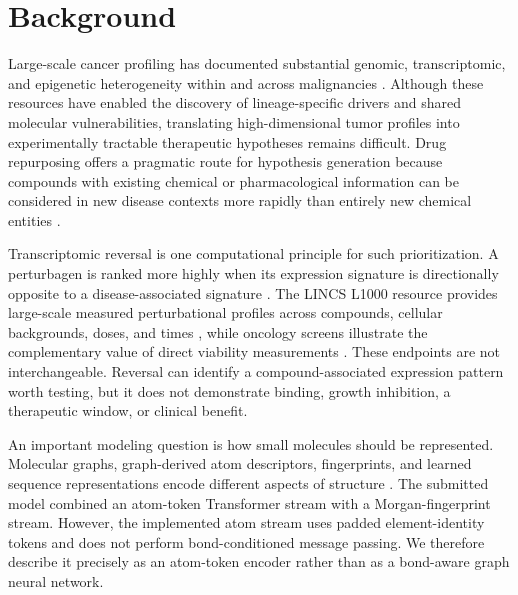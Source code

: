 \section{Background}

\begin{minorrevision}
Large-scale cancer profiling has documented substantial genomic, transcriptomic, and epigenetic heterogeneity within and across malignancies \cite{weinstein2013,rodriguez2020,martinez2023}. Although these resources have enabled the discovery of lineage-specific drivers and shared molecular vulnerabilities, translating high-dimensional tumor profiles into experimentally tractable therapeutic hypotheses remains difficult. Drug repurposing offers a pragmatic route for hypothesis generation because compounds with existing chemical or pharmacological information can be considered in new disease contexts more rapidly than entirely new chemical entities \cite{pushpakom2019,nosengo2016}.

Transcriptomic reversal is one computational principle for such prioritization. A perturbagen is ranked more highly when its expression signature is directionally opposite to a disease-associated signature \cite{chen2017}. The LINCS L1000 resource provides large-scale measured perturbational profiles across compounds, cellular backgrounds, doses, and times \cite{subramanian2017}, while oncology screens illustrate the complementary value of direct viability measurements \cite{corsello2020}. These endpoints are not interchangeable. Reversal can identify a compound-associated expression pattern worth testing, but it does not demonstrate binding, growth inhibition, a therapeutic window, or clinical benefit.\par
\end{minorrevision}

An important modeling question is how small molecules should be represented. Molecular graphs, graph-derived atom descriptors, fingerprints, and learned sequence representations encode different aspects of structure \cite{gilmer2017,kipf2017,velickovic2018,wu2018,yang2019,honda2019}. The submitted model combined an atom-token Transformer stream with a Morgan-fingerprint stream. However, the implemented atom stream uses padded element-identity tokens and does not perform bond-conditioned message passing. We therefore describe it precisely as an atom-token encoder rather than as a bond-aware graph neural network.

